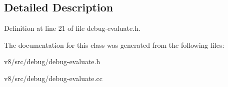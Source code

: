 \subsection{Detailed Description}


Definition at line 21 of file debug-\/evaluate.\+h.



The documentation for this class was generated from the following files\+:\begin{DoxyCompactItemize}
\item 
v8/src/debug/debug-\/evaluate.\+h\item 
v8/src/debug/debug-\/evaluate.\+cc\end{DoxyCompactItemize}
